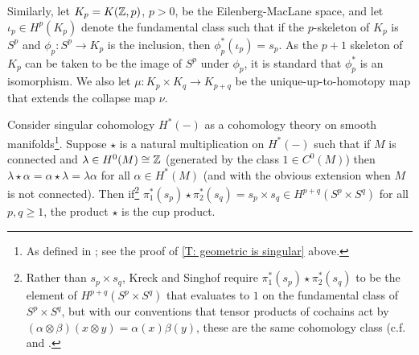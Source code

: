 Similarly, let $K_p=K(\mathbb{Z},p)$, $p>0$, be the Eilenberg-MacLane space, and let $\iota_p\in H^p(K_p)$ denote the fundamental class such that if the $p$-skeleton of $K_p$ is $S^p$ and $\phi_p:S^p\to K_p$ is the inclusion, then $\phi_p^*(\iota_p)=s_p$. As the $p+1$ skeleton of $K_p$ can be taken to be the image of $S^p$ under $\phi_p$, it is standard that $\phi_p^*$ is an isomorphism.
We also let $\mu:K_p\times K_q\to K_{p+q}$ be the unique-up-to-homotopy map that extends the collapse map $\nu$.


\begin{proposition}\label{P: Kreck-Singhof pairing}
Consider singular cohomology $H^*(-)$ as a cohomology theory on smooth manifolds\footnote{As defined in \cite{Krec10b}; see the proof of \cref{T: geometric is singular} above.}. Suppose $\star$ is a natural multiplication on $H^*(-)$ such that if $M$ is connected and $\lambda\in H^0(M)\cong \mathbb{Z}$ (generated by the class $1\in C^0(M)$) then $\lambda\star \alpha=\alpha\star \lambda=\lambda\alpha$ for all $\alpha\in H^*(M)$ (and with the obvious extension when $M$ is not connected). Then if\footnote{Rather than $s_p\times s_q$, Kreck and Singhof require $\pi_1^*(s_p) \star \pi_2^*(s_q)$ to be the element of $H^{p+q}(S^p\times S^q)$ that evaluates to $1$ on the fundamental class of $S^p\times S^q$, but with our conventions that tensor products of cochains act by $(\alpha\otimes \beta)(x\otimes y)=\alpha(x)\beta(y)$, these are the same cohomology class (c.f.\ \cite[page 245]{Span81} and \cite[Section 3B]{Hatc02}. } $\pi_1^*(s_p) \star \pi_2^*(s_q)=s_p\times s_q\in H^{p+q}(S^p\times S^q)$ for all $p,q\geq 1$, the product $\star$ is the cup product.
\end{proposition}

